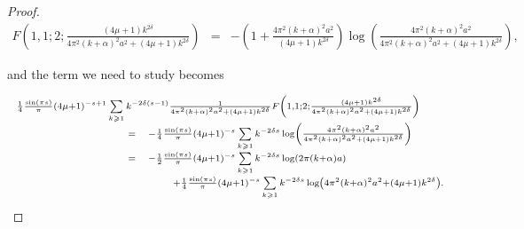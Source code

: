 \documentclass{jams-l}
\theoremstyle{definition}
\theoremstyle{remark}
\numberwithin{equation}{section}
\begin{document}
\begin{proof}
                        \[ \begin{array}{lll}
                                \scriptstyle F \left( 1, 1; 2; \frac{\left( 4 \mu + 1 \right) k^{2 \delta}}{4 \pi^2 \left( k + \alpha \right)^2 a^2 + \left( 4 \mu + 1 \right) k^{2 \delta}} \right) & \scriptstyle = & \scriptstyle - \left( 1 + \frac{4 \pi^2 \left( k + \alpha \right)^2 a^2}{\left( 4 \mu + 1 \right) k^{2 \delta}} \right) \log \left( \frac{4 \pi^2 \left( k + \alpha \right)^2 a^2}{4 \pi^2 \left( k + \alpha \right)^2 a^2 + \left( 4 \mu + 1 \right) k^{2 \delta}} \right),
                            \end{array} \]
                        
                        \noindent and the term we need to study becomes
                        
                        \[ \begin{array}{lll}
                                \multicolumn{3}{l}{\scriptstyle \frac{1}{4} \frac{\sin \left( \pi s \right)}{\pi} \left( 4 \mu + 1 \right)^{-s+1} \sum\limits_{k \geqslant 1} k^{-2 \delta \left( s-1 \right)} \frac{1}{4 \pi^2 \left( k + \alpha \right)^2 a^2 + \left( 4 \mu + 1 \right) k^{2 \delta}} F \left( 1, 1; 2; \frac{\left( 4 \mu + 1 \right) k^{2 \delta}}{4 \pi^2 \left( k + \alpha \right)^2 a^2 + \left( 4 \mu + 1 \right) k^{2 \delta}} \right)} \\[0.5em]
                                
                                \qquad \qquad \qquad \qquad & \scriptstyle = & \scriptstyle - \frac{1}{4} \frac{\sin \left( \pi s \right)}{\pi} \left( 4 \mu + 1 \right)^{-s} \sum\limits_{k \geqslant 1} k^{-2 \delta s} \log \left( \frac{4 \pi^2 \left( k + \alpha \right)^2 a^2}{4 \pi^2 \left( k + \alpha \right)^2 a^2 + \left( 4 \mu + 1 \right) k^{2 \delta}} \right) \\[0.5em]
                                
                                & \scriptstyle = & \scriptstyle - \frac{1}{2} \frac{\sin \left( \pi s \right)}{\pi} \left( 4 \mu + 1 \right)^{-s} \sum\limits_{k \geqslant 1} k^{-2 \delta s} \log \left( 2 \pi \left( k + \alpha \right) a \right) \\[0.5em]
                                
                                && \scriptstyle \qquad + \frac{1}{4} \frac{\sin \left( \pi s \right)}{\pi} \left( 4 \mu + 1 \right)^{-s} \sum\limits_{k \geqslant 1} k^{-2 \delta s} \log \left( 4 \pi^2 \left( k + \alpha \right)^2 a^2 + \left( 4 \mu + 1 \right) k^{2 \delta} \right).
                            \end{array} \]
                        

\end{proof}
\end{document}
